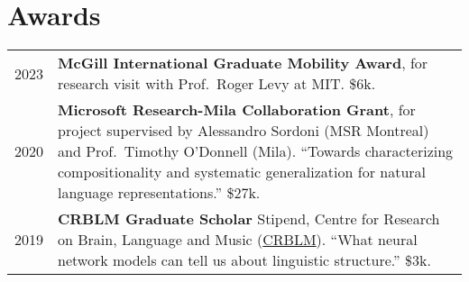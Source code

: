 \documentclass[11pt,a4paper]{article}
\begin{document}

  \section{Awards}
  \begin{longtable}{p{1.7cm}|p{15cm}}
    \textsc{2023}&%
      \textbf{McGill International Graduate Mobility Award},
      for research visit with Prof.\ Roger Levy at MIT. \$6k.\\
    \textsc{2020}&%
      \textbf{Microsoft Research-Mila Collaboration Grant}, for project
      supervised by Alessandro Sordoni (MSR Montreal) and Prof.\ Timothy
      O'Donnell (Mila). ``Towards characterizing compositionality and systematic
      generalization for natural language representations.'' \$27k.\\
    \textsc{2019}&%
      \textbf{CRBLM Graduate Scholar} Stipend, Centre for Research on Brain, Language
      and Music (\href{https://crblm.ca/}{CRBLM}). ``What neural network models
      can tell us about linguistic structure.'' \$3k.\\
  \end{longtable}
\end{document}
